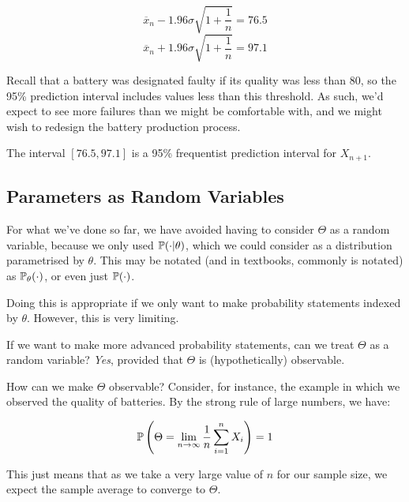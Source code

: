 \documentclass[a4paper]{article}
\begin{document}
                \[
                    \overline x_n - 1.96 \sigma \sqrt{1 + \frac{1}{n}} = 76.5
                \]
                \[
                    \overline x_n + 1.96 \sigma \sqrt{1 + \frac{1}{n}} = 97.1
                \]

                Recall that a battery was designated faulty if its quality was
                less than 80, so the 95\% prediction interval includes values
                less than this threshold. As such, we'd expect to see more
                failures than we might be comfortable with, and we might wish to
                redesign the battery production process.

                The interval $[76.5, 97.1]$ is a 95\% frequentist prediction
                interval for $X_{n + 1}$.


        \subsection{Parameters as Random Variables}
            \begin{fread}
                [DS12, section 7.1]
            \end{fread}

            For what we've done so far, we have avoided having to consider
            $\Theta$ as a random variable, because we only used $\mathbb{P}(\cdot |
            \theta)$, which we could consider as a distribution parametrised by
            $\theta$. This may be notated (and in textbooks, commonly is
            notated) as $\mathbb{P}_\theta(\cdot)$, or even just $\mathbb{P}(\cdot)$.

            Doing this is appropriate if we only want to make probability
            statements indexed by $\theta$. However, this is very limiting.

            If we want to make more advanced probability statements, can we
            treat $\Theta$ as a random variable? \textit{Yes}, provided that
            $\Theta$ is (hypothetically) observable.

            How can we make $\Theta$ observable? Consider, for instance, the
            example in which we observed the quality of batteries. By the strong
            rule of large numbers, we have:

            \[
                \mathbb{P}\left(\Theta = \lim_{n \to \infty} \frac{1}{n}
                \sum_{i=1}^n X_i\right) = 1
            \]

            This just means that as we take a very large value of $n$ for our
            sample size, we expect the sample average to converge to $\Theta$.
\end{document}
